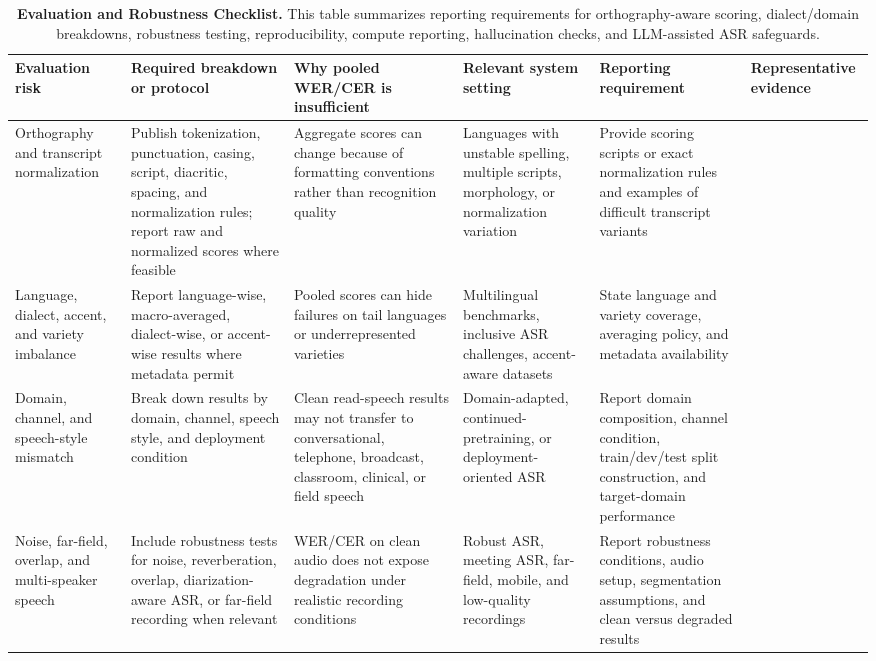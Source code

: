 \documentclass[pdflatex,sn-basic]{sn-jnl}
\theoremstyle{thmstyleone}
\theoremstyle{thmstyletwo}
\theoremstyle{thmstylethree}
\begin{document}
\begin{table}[htbp]
\setcounter{table}{4}
\footnotesize
\centering
\caption{\textbf{Evaluation and Robustness Checklist.} This table summarizes reporting requirements for orthography-aware scoring, dialect/domain breakdowns, robustness testing, reproducibility, compute reporting, hallucination checks, and LLM-assisted ASR safeguards.}
\label{tab:5}
\begin{tabularx}{\textwidth}{YYYYYY}
\toprule
\textbf{Evaluation risk} & \textbf{Required breakdown or protocol} & \textbf{Why pooled WER/CER is insufficient} & \textbf{Relevant system setting} & \textbf{Reporting requirement} & \textbf{Representative evidence} \\
\midrule
Orthography and transcript normalization & Publish tokenization, punctuation, casing, script, diacritic, spacing, and normalization rules; report raw and normalized scores where feasible & Aggregate scores can change because of formatting conventions rather than recognition quality & Languages with unstable spelling, multiple scripts, morphology, or normalization variation & Provide scoring scripts or exact normalization rules and examples of difficult transcript variants & \citep{karita2023lenient,thennal2024cer,lau2025_data_quality_multilingual_speech} \\
Language, dialect, accent, and variety imbalance & Report language-wise, macro-averaged, dialect-wise, or accent-wise results where metadata permit & Pooled scores can hide failures on tail languages or underrepresented varieties & Multilingual benchmarks, inclusive ASR challenges, accent-aware datasets & State language and variety coverage, averaging policy, and metadata availability & \citep{shi2023mlsuperb,conneau2022fleurs,chen2025mlsuperb2challenge,olatunji2023_afrispeech200} \\
Domain, channel, and speech-style mismatch & Break down results by domain, channel, speech style, and deployment condition & Clean read-speech results may not transfer to conversational, telephone, broadcast, classroom, clinical, or field speech & Domain-adapted, continued-pretraining, or deployment-oriented ASR & Report domain composition, channel condition, train/dev/test split construction, and target-domain performance & \citep{conneau2022xtreme_s,peterson2022_openasr21,tian24_interspeech} \\
Noise, far-field, overlap, and multi-speaker speech & Include robustness tests for noise, reverberation, overlap, diarization-aware ASR, or far-field recording when relevant & WER/CER on clean audio does not expose degradation under realistic recording conditions & Robust ASR, meeting ASR, far-field, mobile, and low-quality recordings & Report robustness conditions, audio setup, segmentation assumptions, and clean versus degraded results & \citep{watanabe2020chime6,cornell2023chime7} \\

\end{tabularx}
\end{table}
\end{document}
